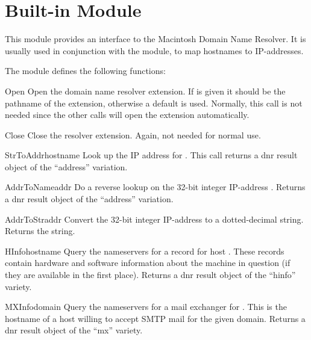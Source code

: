 
\section{Built-in Module }

This module provides an interface to the Macintosh Domain Name
Resolver. It is usually used in conjunction with the  module, to
map hostnames to IP-addresses.

The  module defines the following functions:

\renewcommand{\indexsubitem}{(in module macdnr)}

\begin{funcdesc}{Open}{}
Open the domain name resolver extension. If  is given it
should be the pathname of the extension, otherwise a default is
used. Normally, this call is not needed since the other calls will
open the extension automatically.
\end{funcdesc}

\begin{funcdesc}{Close}{}
Close the resolver extension. Again, not needed for normal use.
\end{funcdesc}

\begin{funcdesc}{StrToAddr}{hostname}
Look up the IP address for . This call returns a dnr
result object of the ``address'' variation.
\end{funcdesc}

\begin{funcdesc}{AddrToName}{addr}
Do a reverse lookup on the 32-bit integer IP-address
. Returns a dnr result object of the ``address'' variation.
\end{funcdesc}

\begin{funcdesc}{AddrToStr}{addr}
Convert the 32-bit integer IP-address  to a dotted-decimal
string. Returns the string.
\end{funcdesc}

\begin{funcdesc}{HInfo}{hostname}
Query the nameservers for a  record for host
. These records contain hardware and software
information about the machine in question (if they are available in
the first place). Returns a dnr result object of the ``hinfo''
variety.
\end{funcdesc}

\begin{funcdesc}{MXInfo}{domain}
Query the nameservers for a mail exchanger for . This is
the hostname of a host willing to accept SMTP mail for the given
domain. Returns a dnr result object of the ``mx'' variety.
\end{funcdesc}

